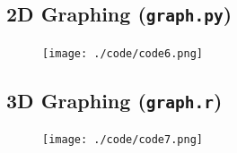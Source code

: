 \documentclass{article}
\begin{document}
\subsection{2D Graphing (\texttt{graph.py})}
    \begin{figure}[H]
        \begin{minipage}{\textwidth}
            \centering
            \texttt{[image: ./code/code6.png]}
        \end{minipage}
    \end{figure}

\subsection{3D Graphing (\texttt{graph.r})}
    \begin{figure}[H]
        \begin{minipage}{\textwidth}
            \centering
            \texttt{[image: ./code/code7.png]}
        \end{minipage}
    \end{figure}
\end{document}
